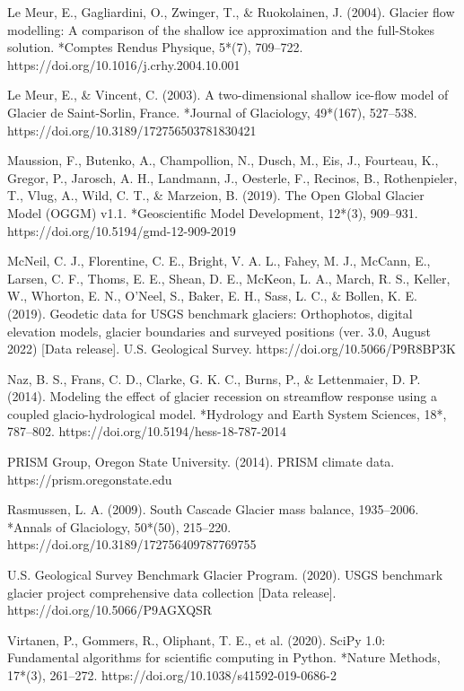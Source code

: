 \documentclass{article}
\begin{document}
\begin{thebibliography}{}
    Le Meur, E., Gagliardini, O., Zwinger, T., \& Ruokolainen, J. (2004). Glacier flow modelling: A comparison of the shallow ice approximation and the full-Stokes solution. *Comptes Rendus Physique, 5*(7), 709–722. https://doi.org/10.1016/j.crhy.2004.10.001

    Le Meur, E., \& Vincent, C. (2003). A two-dimensional shallow ice-flow model of Glacier de Saint-Sorlin, France. *Journal of Glaciology, 49*(167), 527–538. https://doi.org/10.3189/172756503781830421

    Maussion, F., Butenko, A., Champollion, N., Dusch, M., Eis, J., Fourteau, K., Gregor, P., Jarosch, A. H., Landmann, J., Oesterle, F., Recinos, B., Rothenpieler, T., Vlug, A., Wild, C. T., \& Marzeion, B. (2019). The Open Global Glacier Model (OGGM) v1.1. *Geoscientific Model Development, 12*(3), 909–931. https://doi.org/10.5194/gmd-12-909-2019

    McNeil, C. J., Florentine, C. E., Bright, V. A. L., Fahey, M. J., McCann, E., Larsen, C. F., Thoms, E. E., Shean, D. E., McKeon, L. A., March, R. S., Keller, W., Whorton, E. N., O’Neel, S., Baker, E. H., Sass, L. C., \& Bollen, K. E. (2019). Geodetic data for USGS benchmark glaciers: Orthophotos, digital elevation models, glacier boundaries and surveyed positions (ver. 3.0, August 2022) [Data release]. U.S. Geological Survey. https://doi.org/10.5066/P9R8BP3K

    Naz, B. S., Frans, C. D., Clarke, G. K. C., Burns, P., \& Lettenmaier, D. P. (2014). Modeling the effect of glacier recession on streamflow response using a coupled glacio-hydrological model. *Hydrology and Earth System Sciences, 18*, 787–802. https://doi.org/10.5194/hess-18-787-2014

    PRISM Group, Oregon State University. (2014). PRISM climate data. https://prism.oregonstate.edu

    Rasmussen, L. A. (2009). South Cascade Glacier mass balance, 1935–2006. *Annals of Glaciology, 50*(50), 215–220. https://doi.org/10.3189/172756409787769755

    U.S. Geological Survey Benchmark Glacier Program. (2020). USGS benchmark glacier project comprehensive data collection [Data release]. https://doi.org/10.5066/P9AGXQSR

    Virtanen, P., Gommers, R., Oliphant, T. E., et al. (2020). SciPy 1.0: Fundamental algorithms for scientific computing in Python. *Nature Methods, 17*(3), 261–272. https://doi.org/10.1038/s41592-019-0686-2

\end{thebibliography}
  
\end{document}
